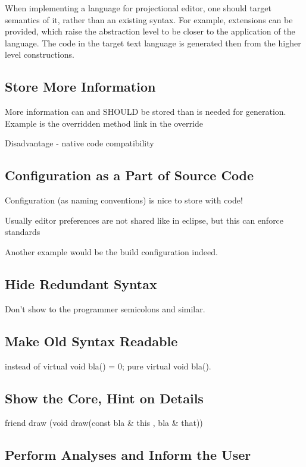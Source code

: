  When implementing a language for projectional editor, one should target semantics of it, rather than an existing syntax.
For example, extensions can be provided, which raise the abstraction level to be closer to the application of the language.
The code in the target text language is generated then from the higher level constructions.

\subsection{Store More Information}
 More information can and SHOULD be stored than is needed for generation.
 Example is the overridden method link in the override

 Disadvantage - native code compatibility

\subsection{Configuration as a Part of Source Code}
 Configuration (as naming conventions) is nice to store with code! 

 Usually editor preferences are not shared like in eclipse, but this can enforce standards
 
 Another example would be the build configuration indeed.

\subsection{Hide Redundant Syntax}

Don't show to the programmer semicolons and similar.

\subsection{Make Old Syntax Readable}

instead of virtual void bla() = 0;   pure virtual void bla().

\subsection{Show the Core, Hint on Details}
 friend draw     (void draw(const bla \& this , bla \& that))

\subsection{Perform Analyses and Inform the User}

